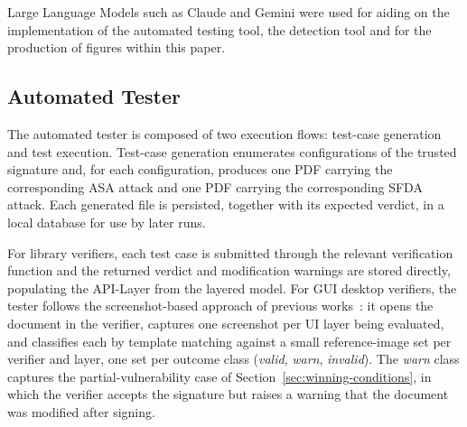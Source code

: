\documentclass[12pt]{article}
\begin{document}
Large Language Models such as Claude and Gemini were used for aiding on the implementation of the automated testing tool, the detection tool and for the production of figures within this paper.


\subsection{Automated Tester} \label{sec:automated-tester}

The automated tester is composed of two execution flows: test-case generation and test execution. Test-case generation enumerates configurations of the trusted signature and, for each configuration, produces one PDF carrying the corresponding ASA attack and one PDF carrying the corresponding SFDA attack. Each generated file is persisted, together with its expected verdict, in a local database for use by later runs.
%
%

For library verifiers, each test case is submitted through the relevant verification function and the returned verdict and modification warnings are stored directly, populating the API-Layer from the layered model. For GUI desktop verifiers, the tester follows the screenshot-based approach of previous works~\cite{pdf-certification-attack}: it opens the document in the verifier, captures one screenshot per UI layer being evaluated, and classifies each by template matching against a small reference-image set per verifier and layer, one set per outcome class (\emph{valid}, \emph{warn}, \emph{invalid}). The \emph{warn} class captures the partial-vulnerability case of Section~\ref{sec:winning-conditions}, in which the verifier accepts the signature but raises a warning that the document was modified after signing.
\end{document}
